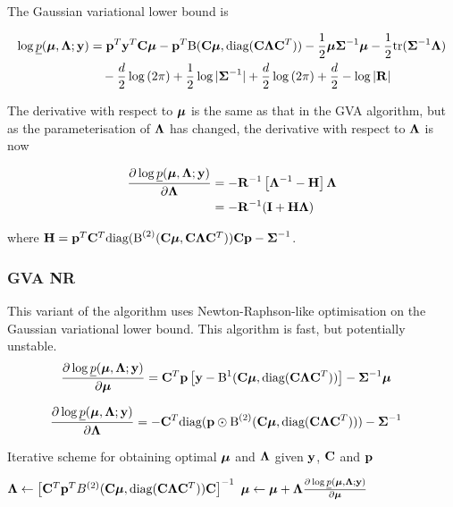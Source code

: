 \documentclass{article}[12pt]
\begin{document}
\noindent The Gaussian variational lower bound is

\begin{align*}
\log \underline{p}({\boldsymbol \mu}, {\boldsymbol \Lambda}; {\bf y}) &= {\bf p}^T{\bf y}^T{\bf C} {\boldsymbol \mu} - {\bf p}^T {\text{B}}({\bf C} {\boldsymbol \mu}, \text{diag}({\bf C} {\boldsymbol \Lambda} {\bf C}^T)) - {\frac{1}{2}} {\boldsymbol \mu} {\boldsymbol \Sigma}^{-1} {\boldsymbol \mu} - {\frac{1}{2}} \text{tr}{({\boldsymbol\Sigma}^{-1} {\boldsymbol\Lambda})} \\
&\quad- \frac{d}{2} \log{(2 \pi)} + {\frac{1}{2}} \log{|{\boldsymbol\Sigma}^{-1}|} + \frac{d}{2} \log{(2 \pi)} + \frac{d}{2} - \log{|{\bf R}|}
\end{align*}

\noindent The derivative with respect to ${\boldsymbol \mu}$ is the same as that in the GVA 
algorithm, but as the parameterisation of ${\boldsymbol \Lambda}$ has changed, the  
derivative with respect to ${\boldsymbol \Lambda}$ is now

\begin{align*}
\frac{\partial \log \underline{p}({\boldsymbol \mu}, {\boldsymbol \Lambda}; {\bf y})}{\partial {\boldsymbol\Lambda}} &= -{\bf R}^{-1}\left [{\boldsymbol \Lambda}^{-1} - {\bf H} \right ]{\boldsymbol\Lambda} \\
&= -{\bf R}^{-1} ({\bf I} + {\bf H} {\boldsymbol \Lambda})
\end{align*} 

\noindent where ${\bf H} = {\bf p}^T {\bf C}^T \text{diag}({\text{B}}^{(2)}({\bf C} {\boldsymbol \mu}, {\bf C} {\boldsymbol \Lambda} {\bf C}^T)) {\bf C} {\bf p} - {\boldsymbol \Sigma}^{-1}$.


\subsubsection{GVA NR}
This variant of the algorithm uses Newton-Raphson-like optimisation on the Gaussian
variational lower bound. This algorithm is fast, but potentially unstable.
\begin{align*}
\frac{\partial \log \underline{p}({\boldsymbol \mu}, {\boldsymbol \Lambda}; {\bf y})}{\partial {\boldsymbol\mu}} &= {\bf C}^T{\bf p} \left [{\bf y} - {\text{B}}^{1}({\bf C} {\boldsymbol \mu}, \text{diag}({\bf C} {\boldsymbol \Lambda} {\bf C}^T)) \right ] - {\boldsymbol \Sigma}^{-1} {\boldsymbol \mu}
\end{align*}

\begin{align*}
\frac{\partial \log \underline{p}({\boldsymbol \mu}, {\boldsymbol \Lambda}; {\bf y})}{\partial {\boldsymbol\Lambda}} &= -{\bf C}^T \text{diag}({\bf p} \odot {\text{B}}^{(2)}({\bf C} {\boldsymbol \mu}, \text{diag}({\bf C} {\boldsymbol \Lambda} {\bf C}^T))) - {\boldsymbol \Sigma}^{-1}
\end{align*}

\begin{algorithm}\label{alg:algorithm_nr}
\label{algorithm_nr}
\caption[Algorithm GVA NR]{Iterative scheme for obtaining optimal ${\boldsymbol \mu}$ and ${\boldsymbol \Lambda}$
given ${\bf y}$, ${\bf C}$ and ${\bf p}$}
\begin{algorithmic}
\STATE ${\boldsymbol \Lambda} \leftarrow \left [ {\bf C}^T{\bf p}^T B^{(2)}({\bf C} {\boldsymbol \mu}, \text{diag}({\bf C} {\boldsymbol \Lambda} {\bf C}^T)) {\bf C} \right ]^{-1}$
\STATE ${\boldsymbol \mu} \leftarrow {\boldsymbol\mu} + {\boldsymbol \Lambda} \frac{\partial \log \underline{p}({\boldsymbol \mu}, {\boldsymbol \Lambda}; {\bf y})}{\partial {\boldsymbol\mu}}$
\ENDWHILE
\end{algorithmic}
\end{algorithm}
\end{document}
